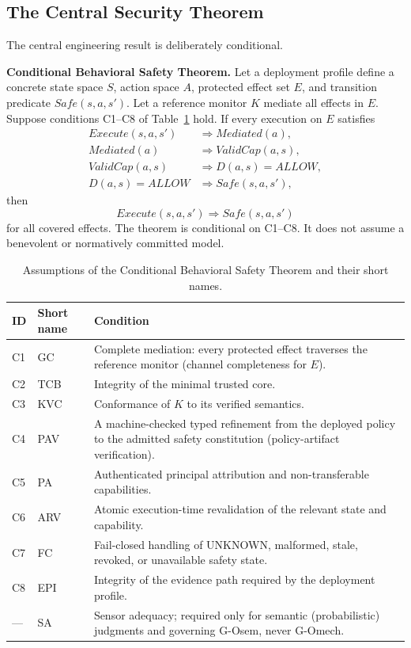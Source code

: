 \documentclass[11pt]{article}
\def\ensuremath#1{#1}%
\def\mathrm#1{#1}%
\def\mathsf#1{#1}%
\def\textsuperscript#1{#1}%
\newcommand{\Gmech}{G-O\textsuperscript{mech}}
\newcommand{\Gsem}{G-O\textsuperscript{sem}}
\newcommand{\Safe}{\ensuremath{\mathsf{Safe}}}
\newcommand{\ALLOW}{\ensuremath{\mathsf{ALLOW}}}
\newcommand{\UNKNOWN}{\ensuremath{\mathsf{UNKNOWN}}}
\newcommand{\Execute}{\ensuremath{\mathrm{Execute}}}
\newcommand{\Mediated}{\ensuremath{\mathrm{Mediated}}}
\newcommand{\ValidCap}{\ensuremath{\mathrm{ValidCap}}}
\begin{document}
\subsection{The Central Security Theorem}
The central engineering result is deliberately conditional.
\begin{keyresult}
\textbf{Conditional Behavioral Safety Theorem.} Let a deployment profile define a concrete state space \(S\), action space \(A\), protected effect set \(E\), and transition predicate \(\Safe(s,a,s')\). Let a reference monitor \(K\) mediate all effects in \(E\). Suppose conditions C1--C8 of Table~\ref{tab:conditions} hold. If every execution on \(E\) satisfies
\[
\begin{aligned}
\Execute(s,a,s') &\Rightarrow \Mediated(a),\\
\Mediated(a) &\Rightarrow \ValidCap(a,s),\\
\ValidCap(a,s) &\Rightarrow D(a,s)=\ALLOW,\\
D(a,s)=\ALLOW &\Rightarrow \Safe(s,a,s'),
\end{aligned}
\]
then
\[
\Execute(s,a,s')\Rightarrow \Safe(s,a,s')
\]
for all covered effects. The theorem is conditional on C1--C8. It does not assume a benevolent or normatively committed model.
\end{keyresult}

\begin{table}[H]
\centering
\small
\renewcommand{\arraystretch}{1.2}
\begin{tabular}{@{}l l p{9.0cm}@{}}
\toprule
\textbf{ID} & \textbf{Short name} & \textbf{Condition}\\
\midrule
C1 & GC & Complete mediation: every protected effect traverses the reference monitor (channel completeness for $E$).\\
C2 & TCB & Integrity of the minimal trusted core.\\
C3 & KVC & Conformance of $K$ to its verified semantics.\\
C4 & PAV & A machine-checked typed refinement from the deployed policy to the admitted safety constitution (policy-artifact verification).\\
C5 & PA & Authenticated principal attribution and non-transferable capabilities.\\
C6 & ARV & Atomic execution-time revalidation of the relevant state and capability.\\
C7 & FC & Fail-closed handling of \UNKNOWN{}, malformed, stale, revoked, or unavailable safety state.\\
C8 & EPI & Integrity of the evidence path required by the deployment profile.\\
\midrule
--- & SA & Sensor adequacy; required only for semantic (probabilistic) judgments and governing \Gsem{}, never \Gmech{}.\\
\bottomrule
\end{tabular}
\caption{Assumptions of the Conditional Behavioral Safety Theorem and their short names.}
\label{tab:conditions}
\end{table}
\end{document}
